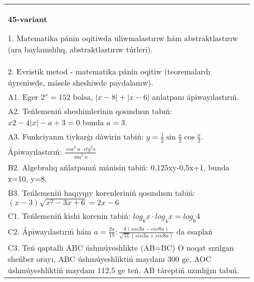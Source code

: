 \documentclass{article}
\begin{document}
\begin{tabular}{m{17cm}}
\textbf{45-variant}

1. Matematika pánin oqitiwda uliwmalastırıw hám abstraktlastırıw (ara baylanıslılıq, abstraktlastırıw túrleri). \\
2. Evristik metod - matematika pánin oqitiw (teoremalardı úyreniwde, másele sheshiwde paydalanıw). \\
A1. Eger \(2^{x} = 152\) bolsa, \(|x - 8| + |x - 6|\) anlatpanı ápiwayılastırıń. \\
A2. Teńlemeniń sheshimlerinin qosındısın tabıń: \(x2 - 4|x| - a + 3 = 0\) bunda \(a = 3\). \\
A3. Funkciyanın tiykarģı dáwirin tabiń: \(y = \frac{1}{2}\sin{\frac{x}{2}\cos\frac{x}{2}}\). \\
Ápiwayılastırıń: \(\frac{\cos^{2}a \cdot {ctg}^{2}a}{\sin^{2}a}\) \\
B2. Algebralıq ańlatpanıń mánisin tabiń: 0,125xy-0,5x+1, bunda x=10, y=8. \\
B3. Teńlemeniń haqıyqıy korenleriniń qosındısın tabiń: \((x-3) \sqrt{x^{2} - 3x + 6} = 2x - 6\) \\
C1. Teńlemeniń kishi korenin tabiń: \(log_{6}x \cdot log_{4}x = log_{6}4\) \\
C2. Ápiwayılastırıń hám \(a = \frac{2\pi}{15}:\frac{4 (cos3a - cos8a) }{\sqrt{31} (sin3a + sin8a) }\) da esaplań \\
C3. Teń qaptallı ABC úshmúyeshlikte (AB=BC) O noqat sızılgan sheńber orayı, ABC úshmúyeshliktiń maydanı 300 ge, AOC úshmúyeshliktiń maydanı 112,5 ge teń. AB táreptiń uzınlıǵın tabıń. \\

\end{tabular}
\vspace{1cm}
\end{document}
